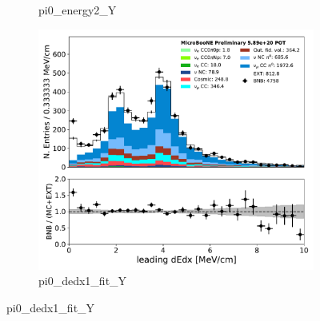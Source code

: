 \begin{figure}[H]
\begin{center}
\begin{subfigure}[b]{0.3\textwidth}
    \caption{\label{fig:pi0:inputs:energy12:RUN1} pi0\_energy2\_Y}
    \end{subfigure}
    \begin{subfigure}[b]{0.3\textwidth}
    \centering
    \includegraphics[width=1.00\textwidth]{pi0/inputs/pi0_dedx1_fit_Y_03182020_presel.pdf}
    \caption{\label{fig:pi0:inputs:gammadot:RUN1} pi0\_dedx1\_fit\_Y}
    \end{subfigure}
\end{center}
\end{figure}

